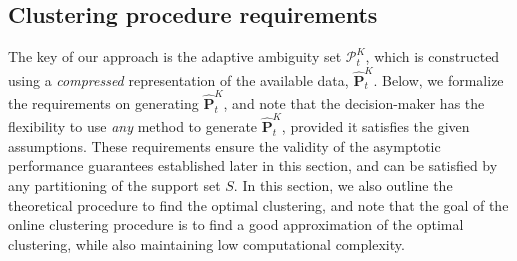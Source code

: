 \documentclass[12pt]{article}
\newcommand{\prob}{{\mathbf P}}
\newcommand{\supp}{S}
\newcommand{\eps}{\varepsilon^K}
\begin{document}
\subsection{Clustering procedure requirements}
\label{sec:shared_cluster}
The key of our approach is the adaptive ambiguity set $\mathcal{P}^K_t$, which is constructed using a {\it compressed} representation of the available data, $\hat{\prob}^K_t$.
Below, we formalize the requirements on generating $\hat{\prob}^K_t$, and note that the decision-maker has the flexibility to use {\it any} method to generate $\hat{\prob}^K_t$, provided it satisfies the given assumptions.
These requirements ensure the validity of the asymptotic performance guarantees established later in this section, and can be satisfied by any partitioning of the support set $\supp$.
In this section, we also outline the theoretical procedure to find the optimal clustering, and note that the goal of the online clustering procedure is to find a good approximation of the optimal clustering, while also maintaining low computational complexity.




\end{document}
